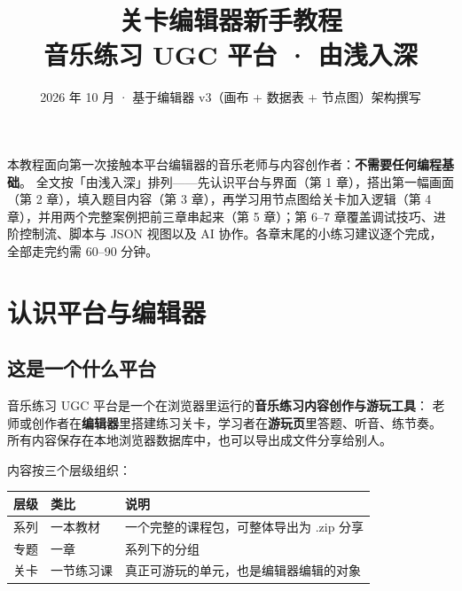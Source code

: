 \documentclass[UTF8,a4paper,zihao=-4]{ctexart}
\title{\heiti 关卡编辑器新手教程\\[0.3em]\large 音乐练习 UGC 平台 · 由浅入深}
\author{}
\date{2026 年 10 月 · 基于编辑器 v3（画布 + 数据表 + 节点图）架构撰写}
\begin{document}
\maketitle
\thispagestyle{empty}

\begin{center}
\begin{minipage}{0.86\textwidth}
\small
本教程面向第一次接触本平台编辑器的音乐老师与内容创作者：\textbf{不需要任何编程基础}。
全文按「由浅入深」排列——先认识平台与界面（第 1 章），搭出第一幅画面（第 2 章），填入题目内容（第 3 章），再学习用节点图给关卡加入逻辑（第 4 章），并用两个完整案例把前三章串起来（第 5 章）；第 6--7 章覆盖调试技巧、进阶控制流、脚本与 JSON 视图以及 AI 协作。各章末尾的小练习建议逐个完成，全部走完约需 60--90 分钟。
\end{minipage}
\end{center}

\vspace{1em}
{\setlength{\parskip}{0.12em}\tableofcontents}
\newpage

\section{认识平台与编辑器}

\subsection{这是一个什么平台}

音乐练习 UGC 平台是一个在浏览器里运行的\textbf{音乐练习内容创作与游玩工具}：
老师或创作者在\textbf{编辑器}里搭建练习关卡，学习者在\textbf{游玩页}里答题、听音、练节奏。
所有内容保存在本地浏览器数据库中，也可以导出成文件分享给别人。

内容按三个层级组织：

\begin{center}
\begin{tabular}{lll}
\toprule
层级 & 类比 & 说明 \\
\midrule
系列 & 一本教材 & 一个完整的课程包，可整体导出为 .zip 分享 \\
专题 & 一章 & 系列下的分组 \\
关卡 & 一节练习课 & 真正可游玩的单元，也是编辑器编辑的对象 \\
\bottomrule
\end{tabular}
\end{center}
\end{document}
